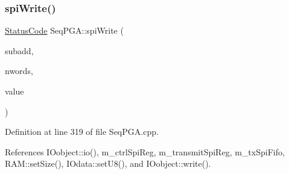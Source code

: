 \subsubsection{\texorpdfstring{spi\+Write()}{spiWrite()}\hspace{0.1cm}{\footnotesize\ttfamily [2/3]}}
{\footnotesize\ttfamily \hyperlink{classStatusCode}{Status\+Code} Seq\+P\+G\+A\+::spi\+Write (\begin{DoxyParamCaption}\item[{unsigned int}]{subadd,  }\item[{unsigned int}]{nwords,  }\item[{Py\+Object $\ast$}]{value }\end{DoxyParamCaption})}



Definition at line 319 of file Seq\+P\+G\+A.\+cpp.



References I\+Oobject\+::io(), m\+\_\+ctrl\+Spi\+Reg, m\+\_\+transmit\+Spi\+Reg, m\+\_\+tx\+Spi\+Fifo, R\+A\+M\+::set\+Size(), I\+Odata\+::set\+U8(), and I\+Oobject\+::write().



